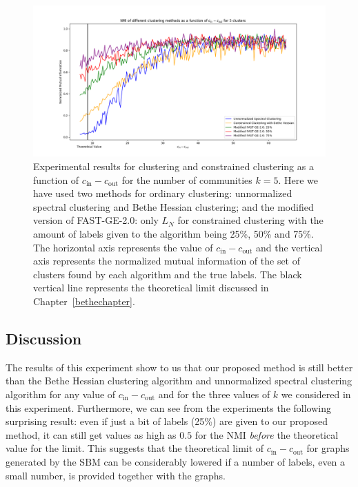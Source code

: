 \begin{figure}[h]
\begin{center}
\includegraphics[width=16cm]{figures/ACDV3.png}
\end{center}
   \caption[Experimental results for clustering and constrained clustering as a function of $c_\text{in} - c_\text{out}$ for the number of communities $k=5$]{Experimental results for clustering and constrained clustering as a function of $c_\text{in} - c_\text{out}$ for the number of communities $k=5$. Here we have used two methods for ordinary clustering: unnormalized spectral clustering and Bethe Hessian clustering; and the modified version of FAST-GE-2.0: only $L_N$ for constrained clustering with the amount of labels given to the algorithm being 25\%, 50\% and 75\%. The horizontal axis represents the value of $c_\text{in} - c_\text{out}$ and the vertical axis represents the normalized mutual information of the set of clusters found by each algorithm and the true labels. The black vertical line represents the theoretical limit discussed in Chapter~\ref{bethechapter}.}
   \label{ACDV3}
\end{figure}

\subsection*{Discussion}
The results of this experiment show to us that our proposed method is still better than the Bethe Hessian clustering algorithm and unnormalized spectral clustering algorithm for any value of $c_\text{in} - c_\text{out}$ and for the three values of $k$ we considered in this experiment.
Furthermore, we can see from the experiments the following surprising result: even if just a bit of labels (25\%) are given to our proposed method, it can still get values as high as $0.5$ for the NMI \textit{before} the theoretical value for the limit.
This suggests that the theoretical limit of $c_\text{in} - c_\text{out}$ for graphs generated by the SBM can be considerably lowered if a number of labels, even a small number, is provided together with the graphs.




